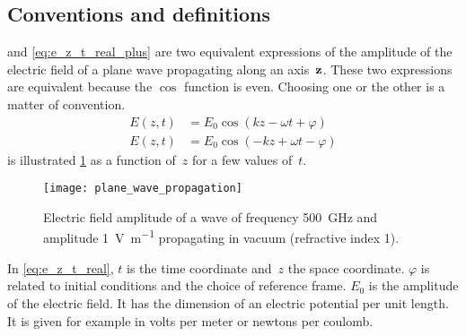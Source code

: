 \subsection{Conventions and definitions}
 and \cref{eq:e_z_t_real_plus} are two equivalent expressions of the amplitude of the electric field of a plane wave propagating along an axis~$\mathbf{z}$.
These two expressions are equivalent because the $\cos$ function is even.
Choosing one or the other is a matter of convention.
\begin{subequations}
    \begin{align}
       E(z, t) &= E_0 \cos( kz - \omega t + \varphi)   \label{eq:e_z_t_real_minus} \\
       E(z, t) &= E_0 \cos(-kz + \omega t - \varphi)   \label{eq:e_z_t_real_plus}
    \end{align}
    \label{eq:e_z_t_real}
\end{subequations}
 is illustrated \cref{fig:plane_wave_propagation} as a function of~$z$ for a few values of~$t$.
\begin{figure}[hbp]
    \centering
    \texttt{[image: plane\_wave\_propagation]}
    \caption {\label{fig:plane_wave_propagation}Electric field amplitude of a wave of frequency \SI{500}{\giga\hertz} and amplitude \SI{1}{\volt\per\meter} propagating in vacuum (refractive index 1).}
\end{figure}

In \cref{eq:e_z_t_real}, $t$ is the time coordinate and~$z$ the space coordinate.
$\varphi$ is related to initial conditions and the choice of reference frame.
$E_0$ is the amplitude of the electric field.
It has the dimension of an electric potential per unit length.
It is given for example in volts per meter or newtons per coulomb.

